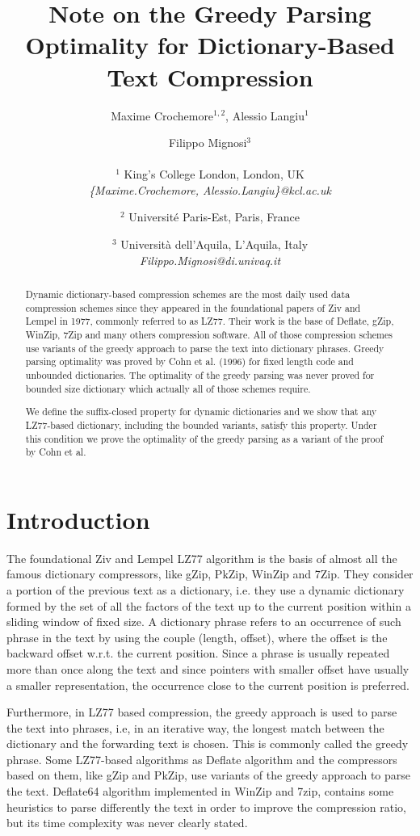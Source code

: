\documentclass[12pt]{article}
\title{\Large{\textbf{Note on the Greedy Parsing Optimality for Dictionary-Based Text Compression}}}
\author{
Maxime Crochemore$^{1,2}$,
Alessio Langiu$^1$ \and
Filippo Mignosi$^3$
\\
\\
$^1$ King's College London, London, UK \\
\textit{\{Maxime.Crochemore, Alessio.Langiu\}@kcl.ac.uk} \and
$^2$ Universit\'e Paris-Est, Paris, France \and
$^3$ Universit\`a dell'Aquila, L'Aquila, Italy \\
\textit{Filippo.Mignosi@di.univaq.it} 
}
\theoremstyle{plain}
\theoremstyle{definition}
\theoremstyle{remark}
\begin{document}
\maketitle



\begin{abstract}
Dynamic dictionary-based compression schemes are the most daily used data compression schemes since they appeared in the foundational papers of Ziv and Lempel in 1977, commonly referred to as LZ77.
Their work is the base of Deflate, gZip, WinZip, 7Zip and many others compression software. 
All of those compression schemes use variants of the greedy approach to parse the text into dictionary phrases.
Greedy parsing optimality was proved by Cohn et al. (1996) for fixed length code and unbounded dictionaries.
The optimality of the greedy parsing was never proved for bounded size dictionary which actually all of those schemes require.


We define the suffix-closed property for dynamic dictionaries and we 
show that any LZ77-based dictionary, including the bounded variants, 
satisfy this property. Under this condition we prove the optimality of the greedy parsing as a variant of the proof by Cohn et al.
\end{abstract}


\section*{Introduction}\label{sec:intro}

The foundational Ziv and Lempel LZ77 algorithm \cite{lz77} is the basis of almost all the famous dictionary compressors, like gZip, PkZip, WinZip and 7Zip.
They consider a portion of the previous text as a dictionary, i.e. they use a dynamic dictionary formed by the set of all the factors of the text up to the current position within a sliding window of fixed size.
A dictionary phrase refers to an occurrence of such phrase in the text by using the couple (length, offset), where the offset is the backward offset w.r.t. the current position. Since a phrase is usually repeated more than once along the text and since pointers with smaller offset have usually a smaller representation, the occurrence close to the current position is preferred.

Furthermore, in LZ77 based compression, the greedy approach is used to parse the text into phrases, i.e, in an iterative way, the longest match between the dictionary and the forwarding text is chosen.
This is commonly called the greedy phrase.
Some LZ77-based algorithms as Deflate algorithm and the compressors based on them, like gZip and PkZip, use variants of the greedy approach to parse the text. 
Deflate64 algorithm implemented in WinZip and 7zip, contains some heuristics to parse differently the text in order to improve the compression ratio, but its time complexity was never clearly stated. 
\end{document}
